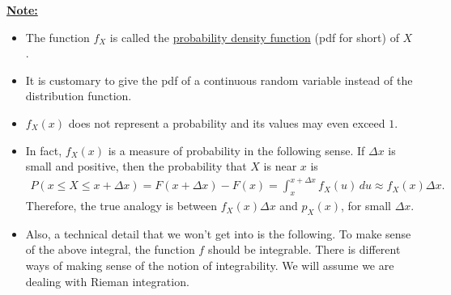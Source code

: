 \underline{\textbf{Note:}} 
    \begin{itemize}
    \item The function $f_X$ is called the \underline{probability density function} (pdf for short) of $X$. 
    \item It is customary to give the pdf of a continuous random variable instead of the distribution function.
    \item $f_X(x)$ does not represent a probability and its values may even exceed $1$.
    \item In fact, $f_X (x)$ is a measure of probability in the following sense. If $\Delta x$ is small and positive, then the probability that $X$ is near $x$ is
        \begin{align*}
        P (x \leq X \leq x + \Delta x ) = F (x + \Delta x) - F(x) = \int_{x}^{x + \Delta x} f_X (u) \, du \approx f_X (x) \Delta x .
        \end{align*}
    Therefore, the true analogy is between $f_X (x) \Delta x$ and $p_X (x)$, for small $\Delta x$.  
    \item Also, a technical detail that we won't get into is the following. To make sense of the above integral, the function $f$ should be integrable. There is different ways of making sense of the notion of integrability. We will assume we are dealing with Rieman integration.
    \end{itemize}


